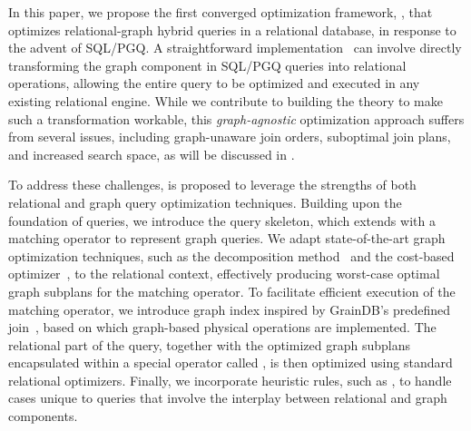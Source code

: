 In this paper, we propose the first converged optimization framework, \name, that optimizes relational-graph hybrid queries in a relational database, in response to the advent of SQL/PGQ. A straightforward implementation~\cite{DuckPGQ,DuckPGQ-VLDB,apache-age} can involve directly transforming the graph component in SQL/PGQ queries into relational operations, allowing the entire query to be optimized and executed in any existing relational engine. While we contribute to building the theory to make such a transformation workable, this \emph{graph-agnostic} optimization approach suffers from several issues, including graph-unaware join orders, suboptimal join plans, and increased search space, as will be discussed in .

To address these challenges, \name is proposed to leverage the strengths of both relational and graph query optimization techniques. Building upon the foundation of \spj queries, we introduce the \spjm query skeleton, which extends \spj with a matching operator to represent graph queries. We adapt state-of-the-art graph optimization techniques, such as the decomposition method~\cite{huge} and the cost-based optimizer~\cite{GLogS}, to the relational context, effectively producing worst-case optimal graph subplans for the matching operator. To facilitate efficient execution of the matching operator, we introduce graph index inspired by GrainDB's predefined join~\cite{graindb}, based on which graph-based physical operations are implemented. The relational part of the query, together with the optimized graph subplans encapsulated within a special operator called \scangraphtable, is then optimized using standard relational optimizers. Finally, we incorporate heuristic rules, such as \filterrule, to handle cases unique to \spjm queries that involve the interplay between relational and graph components.


